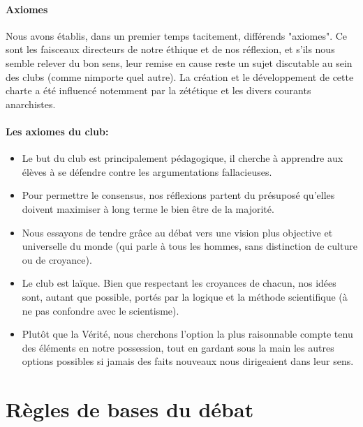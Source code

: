 \documentclass[a4paper,12pt]{article}
\begin{document}
\paragraph{Axiomes}
Nous avons établis, dans un premier temps tacitement, différends "axiomes". Ce sont les faisceaux directeurs de notre éthique et de nos réflexion, et s'ils nous semble relever du bon sens, leur remise en cause reste un sujet discutable au sein des clubs (comme nimporte quel autre). La création et le développement de cette charte a été influencé notemment par la zététique et les divers courants anarchistes.

\paragraph{Les axiomes du club:}
\begin{itemize}
 \item  Le but du club est principalement pédagogique, il cherche à apprendre aux élèves à se défendre contre les argumentations fallacieuses.
 \item  Pour permettre le consensus, nos réflexions partent du présuposé qu'elles doivent maximiser à long terme le bien être de la majorité.
 \item  Nous essayons de tendre grâce au débat vers une vision plus objective et universelle du monde (qui parle à tous les hommes, sans distinction de culture ou de croyance).
 \item  Le club est laïque. Bien que respectant les croyances de chacun, nos idées sont, autant que possible, portés par la logique et la méthode scientifique (à ne pas confondre avec le scientisme).
 \item  Plutôt que la Vérité, nous cherchons l'option la plus raisonnable compte tenu des éléments en notre possession, tout en gardant sous la main les autres options possibles si jamais des faits nouveaux nous dirigeaient dans leur sens.
\end{itemize}

\section{Règles de bases du débat}
\end{document}
